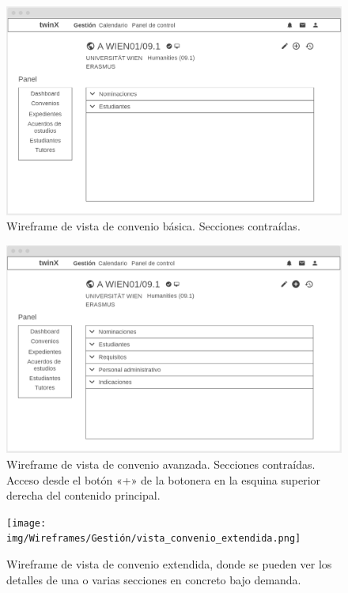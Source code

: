 \begin{figure}
\centering
\includegraphics[width=\textwidth]{img/Wireframes/Gestión/vista_convenio_básica_contraída.png}
\caption[Wireframe de vista de convenio básica]{Wireframe de vista de convenio básica. Secciones contraídas.}
\label{fig:vista_conv_basica_contWF}
\end{figure}

\begin{figure}
	\centering
	\includegraphics[width=\textwidth]{img/Wireframes/Gestión/vista_convenio_avanzada_contraída.png}
	\caption[Wireframe de vista de convenio avanzada]{Wireframe de vista de convenio avanzada. Secciones contraídas. Acceso desde el botón «+» de la botonera en la esquina superior derecha del contenido principal.}
	\label{fig:vista_conv_avanzada_contWF}
\end{figure}

\begin{figure}
	\centering
	\texttt{[image: img/Wireframes/Gestión/vista\_convenio\_extendida.png]}
	\caption[Wireframe de vista de convenio extendida]{Wireframe de vista de convenio extendida, donde se pueden ver los detalles de una o varias secciones en concreto bajo demanda.}
	\label{fig:vista_conv_extendidaWF}
\end{figure}


